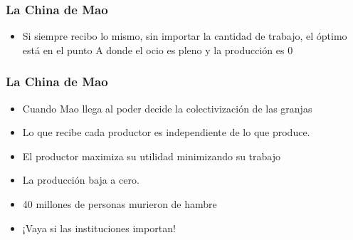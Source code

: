 \documentclass{beamer}
\begin{document}
\begin{frame}
\frametitle{La China de Mao}
\begin{center}
\begin{figure}[H]
\renewcommand{\figurename}{Figure}
\begin{center}
\end{center}
\end{figure}
\end{center}
\begin{itemize}
\item Si siempre recibo lo mismo, sin importar la cantidad de trabajo, el óptimo está en el punto A donde el ocio es pleno y la producción es 0
    \end{itemize}
\end{frame}

\begin{frame}
\frametitle{La China de Mao }
\begin{itemize}
    \item Cuando Mao llega al poder decide la colectivización de las granjas
    \item Lo que recibe cada productor es independiente de lo que produce. 
    \item El productor maximiza su utilidad minimizando su trabajo 
     \item La producción baja a cero.  
     \item 40 millones de personas murieron de hambre
     \item ¡Vaya si las instituciones importan! 
\end{itemize}

\end{frame}
\end{document}
